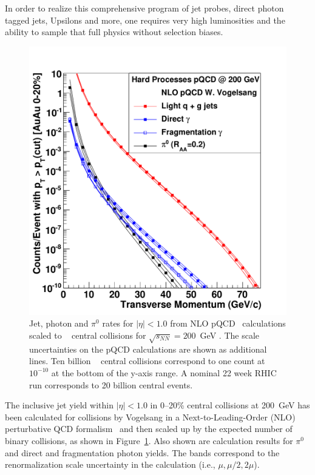 In order to realize this comprehensive program of jet probes, direct photon
tagged jets, Upsilons and more, one requires very high luminosities and the ability to sample that full 
physics without selection biases. 

\begin{figure}[!hbt]
 \begin{center}
    \includegraphics[width=0.7\linewidth]{figs/figure_physicscase_pqcd_jetrates_auau} 
    \caption[Jet, photon and $\pi^{0}$ rates for $|\eta|<1.0$ from NLO
    pQCD calculations scaled to \AuAu central collisions for
    $\sqrt{s_{NN}} = 200$~GeV]{\label{fig:nlo_jetrates}Jet, photon and
      $\pi^{0}$ rates for $|\eta|<1.0$ from NLO
      pQCD~\protect\cite{Vogelsang:NLO}{} calculations scaled to
      \AuAu~ central collisions for $\sqrt{s_{NN}} = 200$~GeV .  The
      scale uncertainties on the pQCD calculations are shown as
      additional lines.  Ten billion \AuAu~ central collisions
      correspond to one count at $10^{-10}$ at the bottom of the
      y-axis range. A nominal 22 week RHIC run corresponds to 20
      billion central \auau events.}
 \end{center}
\end{figure}

The inclusive jet yield within $|\eta| < 1.0$ in 0--20\% central \auau
collisions at 200~GeV has been calculated for \pp collisions by
Vogelsang in a Next-to-Leading-Order (NLO) perturbative QCD
formalism~\cite{Vogelsang:NLO} and then scaled up by the expected
number of binary collisions, as shown in
Figure~\ref{fig:nlo_jetrates}.  Also shown are calculation results for
$\pi^{0}$ and direct and fragmentation photon yields.  The bands
correspond to the renormalization scale uncertainty in the calculation
(i.e., $\mu, \mu/2, 2\mu$).

